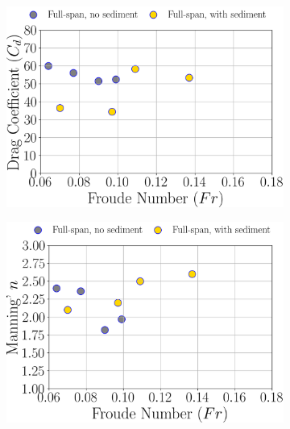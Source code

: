 \documentclass[preview, border=2pt]{standalone}
\begin{document}
\begin{figure}
\begin{subfigure}[b]{0.48\textwidth}
         \includegraphics[width=\textwidth]{Cd_Fr_dependence_full_span_cases.png}
     \end{subfigure}
     \hfill     
     \begin{subfigure}[b]{0.48\textwidth}
         \centering
         \caption{}
         \includegraphics[width=\textwidth]{ManningN_Fr_dependence_full_span_cases.png}
     \end{subfigure}
     \hfill     
     \begin{subfigure}[b]{0.48\textwidth}
         \centering
         \caption{}

\end{subfigure}
\end{figure}
\end{document}

